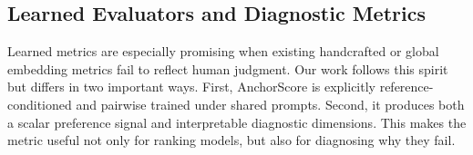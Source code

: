 \subsection{Learned Evaluators and Diagnostic Metrics}
Learned metrics are especially promising when existing handcrafted or global embedding metrics fail to reflect human judgment. Our work follows this spirit but differs in two important ways. First, AnchorScore is explicitly reference-conditioned and pairwise trained under shared prompts. Second, it produces both a scalar preference signal and interpretable diagnostic dimensions. This makes the metric useful not only for ranking models, but also for diagnosing why they fail.
